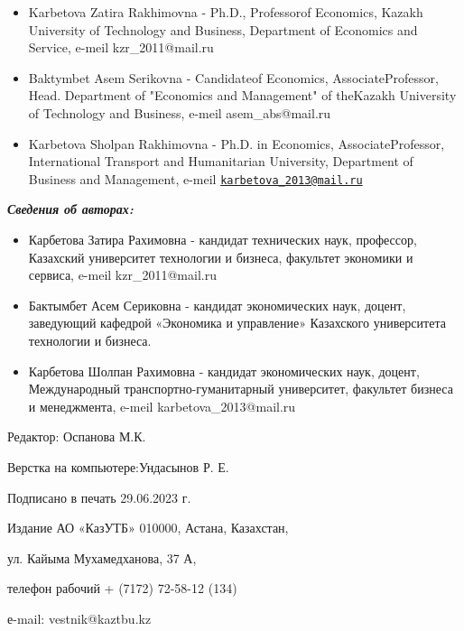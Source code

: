 \begin{itemize}
\item
Karbetova Zatira Rakhimovna - Ph.D., Professorof Economics, Kazakh
University of Technology and Business, Department of Economics and
Service, e-meil kzr\_2011@mail.ru

\item
Baktymbet Asem Serikovna - Candidateof Economics, AssociateProfessor,
Head. Department of "Economics and Management" of theKazakh University
of Technology and Business, e-meil asem\_abs@mail.ru

\item
Karbetova Sholpan Rakhimovna - Ph.D. in Economics, AssociateProfessor,
International Transport and Humanitarian University, Department of
Business and Management, e-meil
\href{mailto:karbetova_2013@mail.ru}{\nolinkurl{karbetova\_2013@mail.ru}}
\end{itemize}

\emph{{\bfseries Сведения об авторах:}}

\begin{itemize}
\item
Карбетова Затира Рахимовна - кандидат технических наук, профессор,
Казахский университет технологии и бизнеса, факультет экономики и
сервиса, e-meil kzr\_2011@mail.ru

\item
Бактымбет Асем Сериковна - кандидат экономических наук, доцент,
заведующий кафедрой «Экономика и управление» Казахского университета
технологии и бизнеса.

\item
Карбетова Шолпан Рахимовна - кандидат экономических наук, доцент,
Международный транспортно-гуманитарный университет, факультет бизнеса и
менеджмента, e-meil karbetova\_2013@mail.ru
\end{itemize}

\newpage

\begin{center}
Редактор: Оспанова М.К.

Верстка на компьютере:Ундасынов Р. Е.

Подписано в печать 29.06.2023 г.

Издание АО «КазУТБ» 010000, Астана, Казахстан,

ул. Кайыма Мухамедханова, 37 А,

телефон рабочий + (7172) 72-58-12 (134)

е-mail: vestnik@kaztbu.kz
\end{center}
